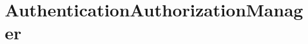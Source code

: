 \href{https://api.travis-ci.org/symbiote-h2020/AuthenticationAuthorizationManager}{\tt } \href{https://codecov.io/github/symbiote-h2020/AuthenticationAuthorizationManager}{\tt }

\section*{Authentication\+Authorization\+Manager}